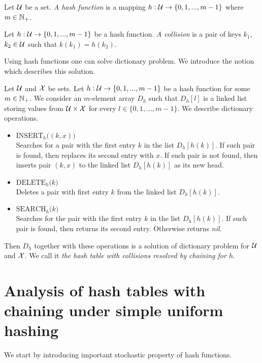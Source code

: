 \begin{definition}
Let ${\mathcal U}$ be a set. \textit{A hash function} is a mapping $h:{\mathcal U}\rightarrow \{0,1,...,m-1\}$ where $m\in {\mathbb N}_+$.
\end{definition}

\begin{definition}
Let $h:{\mathcal U} \rightarrow \{0,1,...,m-1\}$ be a hash function. \textit{A collision} is a pair of keys $k_1$, $k_2\in {\mathcal U}$ such that $k(k_1) = h(k_2)$.
\end{definition}
\noindent
Using hash functions one can solve dictionary problem. We introduce the notion which describes this solution. 

\begin{definition}
Let ${\mathcal U}$ and ${\mathcal X}$ be sets. Let $h:{\mathcal U}\rightarrow \{0,1,...,m-1\}$ be a hash function for some $m\in {\mathbb N}_+$. We consider an $m$-element array $D_h$ such that $D_h[l]$ is a linked list storing values from ${\mathcal U}\times {\mathcal X}$ for every $l\in \{0,1,...,m-1\}$. We describe dictionary operations.
\begin{itemize}
\item[] $\textrm{INSERT}_h\big((k,x)\big)$\\
Searches for a pair with the first entry $k$ in the list $D_h[h(k)]$. If such pair is found, then replaces its second entry with $x$. If such pair is not found, then inserts pair $(k,x)$ to the linked list $D_h[h(k)]$ as its new head.
\item[] $\textrm{DELETE}_h\big(k\big)$\\
Deletes a pair with first entry $k$ from the linked list $D_h[h(k)]$.
\item[] $\textrm{SEARCH}_h\big(k\big)$\\
Searches for the pair with the first entry $k$ in the list $D_h[h(k)]$. If such pair is found, then returns its second entry. Otherwise returns \textit{nil}. 
\end{itemize}
Then $D_h$ together with these operations is a solution of dictionary problem for ${\mathcal U}$ and ${\mathcal X}$. We call it \textit{the hash table with collisions resolved by chaining for $h$}.
\end{definition}

\section{Analysis of hash tables with chaining under simple uniform hashing}
\noindent
We start by introducing important stochastic property of hash functions.

